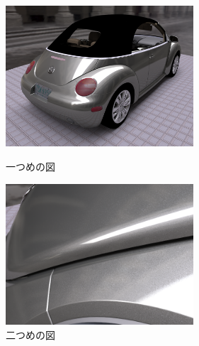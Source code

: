 \begin{figure}[htbp]
 \begin{minipage}{0.4\hsize}
  \begin{center}
   \includegraphics[width=70mm]{./img/back_hq.png}
  \end{center}
  \caption{一つめの図}
  \label{fig:one}
 \end{minipage}
 \begin{minipage}{0.75\hsize}
  \begin{center}
    \includegraphics[width=70mm]{./img/sparkles.png}
  \end{center}
  \caption{二つめの図}
  \label{fig:two}
 \end{minipage}
\end{figure}

